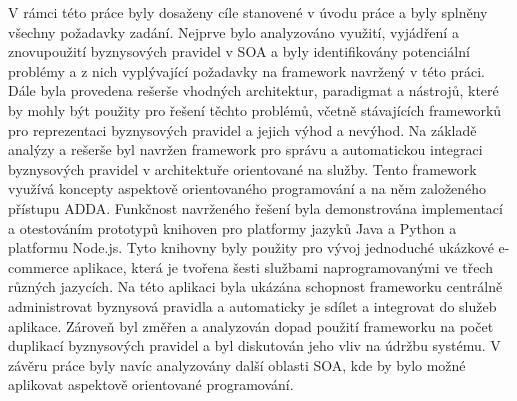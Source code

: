 V rámci této práce byly dosaženy cíle stanovené v úvodu práce a byly splněny všechny
požadavky zadání. Nejprve bylo analyzováno využití, vyjádření a znovupoužití
byznysových pravidel v \gls{SOA} a byly identifikovány potenciální problémy a z nich vyplývající požadavky
na framework navržený v této práci. Dále byla provedena rešerše vhodných architektur,
paradigmat a nástrojů, které by mohly být použity pro řešení těchto problémů, včetně stávajících
frameworků pro reprezentaci byznysových pravidel a jejich výhod a nevýhod. Na základě analýzy a
rešerše byl navržen framework pro správu a automatickou integraci byznysových pravidel
v architektuře orientované na služby. Tento framework využívá koncepty aspektově orientovaného programování
a na něm založeného přístupu \gls{ADDA}. Funkčnost navrženého řešení byla demonstrována implementací a
otestováním prototypů knihoven pro platformy jazyků Java a Python a platformu Node.js. Tyto knihovny byly
použity pro vývoj jednoduché ukázkové e-commerce aplikace, která je tvořena šesti službami naprogramovanými
ve třech různých jazycích. Na této aplikaci byla ukázána schopnost frameworku centrálně administrovat byznysová
pravidla a automaticky je sdílet a integrovat do služeb aplikace. Zároveň byl změřen a analyzován
dopad použití frameworku na počet duplikací byznysových pravidel a byl diskutován jeho vliv na
údržbu systému. V závěru práce byly navíc analyzovány další oblasti \gls{SOA}, kde by bylo možné aplikovat
aspektově orientované programování.
